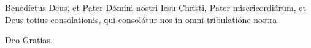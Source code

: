 
Benedíctus Deus, et Pater Dómini nostri Iesu Christi, Pater misericordiárum, et Deus totíus consolationis, qui consolátur nos in omni tribulatióne nostra.

\rubric{\Rbar}Deo Gratias.